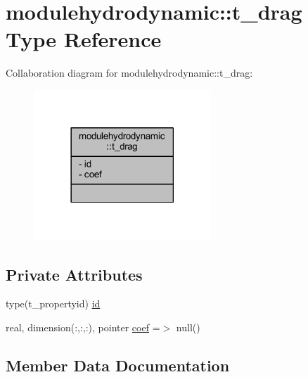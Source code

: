 \hypertarget{structmodulehydrodynamic_1_1t__drag}{}\section{modulehydrodynamic\+:\+:t\+\_\+drag Type Reference}
\label{structmodulehydrodynamic_1_1t__drag}


Collaboration diagram for modulehydrodynamic\+:\+:t\+\_\+drag\+:\nopagebreak
\begin{figure}[H]
\begin{center}
\leavevmode
\includegraphics[width=189pt]{structmodulehydrodynamic_1_1t__drag__coll__graph}
\end{center}
\end{figure}
\subsection*{Private Attributes}
\begin{DoxyCompactItemize}
\item 
type(t\+\_\+propertyid) \mbox{\hyperlink{structmodulehydrodynamic_1_1t__drag_ad5cdf23537bb01c8992ab72008e2fe4d}{id}}
\item 
real, dimension(\+:,\+:,\+:), pointer \mbox{\hyperlink{structmodulehydrodynamic_1_1t__drag_aa9eb679c9cbf7d2a5f667ed43c15b257}{coef}} =$>$ null()
\end{DoxyCompactItemize}


\subsection{Member Data Documentation}
\mbox{\label{structmodulehydrodynamic_1_1t__drag_aa9eb679c9cbf7d2a5f667ed43c15b257}} 
